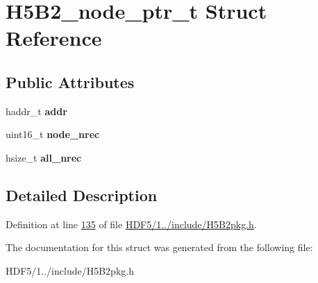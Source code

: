\hypertarget{struct_h5_b2__node__ptr__t}{}\section{H5\+B2\+\_\+node\+\_\+ptr\+\_\+t Struct Reference}
\label{struct_h5_b2__node__ptr__t}
\subsection*{Public Attributes}
\begin{DoxyCompactItemize}
\item 
\mbox{\label{struct_h5_b2__node__ptr__t_a8083f568761f120d4e39f3e81346d672}} 
haddr\+\_\+t {\bfseries addr}
\item 
\mbox{\label{struct_h5_b2__node__ptr__t_ae6cfbe02f6eb2d8b9fb3cee67f54d323}} 
uint16\+\_\+t {\bfseries node\+\_\+nrec}
\item 
\mbox{\label{struct_h5_b2__node__ptr__t_a023041ecb45fd25b347add222b68afd7}} 
hsize\+\_\+t {\bfseries all\+\_\+nrec}
\end{DoxyCompactItemize}


\subsection{Detailed Description}


Definition at line \hyperlink{_h_d_f5_21_810_81_2include_2_h5_b2pkg_8h_source_l00135}{135} of file \hyperlink{_h_d_f5_21_810_81_2include_2_h5_b2pkg_8h_source}{H\+D\+F5/1../include/\+H5\+B2pkg.\+h}.



The documentation for this struct was generated from the following file\+:\begin{DoxyCompactItemize}
\item 
H\+D\+F5/1../include/\+H5\+B2pkg.\+h\end{DoxyCompactItemize}

